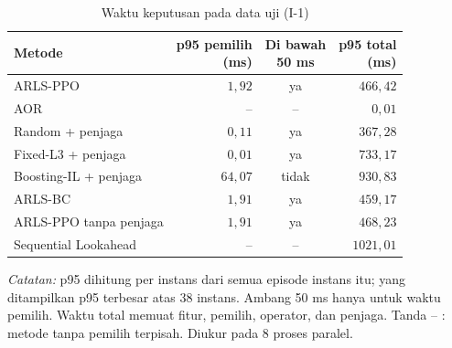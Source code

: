 \begin{table}[htbp]
\caption{Waktu keputusan pada data uji (I-1)}
\label{tab:uji-waktu}
\centering\footnotesize
\setlength{\tabcolsep}{4pt}
\begin{adjustbox}{max width=\textwidth}
\begin{tabular}{lrcr}
\toprule
Metode & \shortstack[r]{p95 pemilih\\(ms)} & \shortstack{Di bawah\\50 ms} & \shortstack[r]{p95 total\\(ms)} \\
\midrule
ARLS-PPO & $1{,}92$ & ya & $466{,}42$ \\
AOR & -- & -- & $0{,}01$ \\
Random + penjaga & $0{,}11$ & ya & $367{,}28$ \\
Fixed-L3 + penjaga & $0{,}01$ & ya & $733{,}17$ \\
Boosting-IL + penjaga & $64{,}07$ & tidak & $930{,}83$ \\
ARLS-BC & $1{,}91$ & ya & $459{,}17$ \\
ARLS-PPO tanpa penjaga & $1{,}91$ & ya & $468{,}23$ \\
Sequential Lookahead & -- & -- & $1021{,}01$ \\
\bottomrule
\end{tabular}
\end{adjustbox}
\par\smallskip\footnotesize\textit{Catatan:} p95 dihitung per instans dari semua episode instans itu; yang ditampilkan p95 terbesar atas 38 instans. Ambang 50 ms hanya untuk waktu pemilih. Waktu total memuat fitur, pemilih, operator, dan penjaga. Tanda -- : metode tanpa pemilih terpisah. Diukur pada 8 proses paralel.
\end{table}
